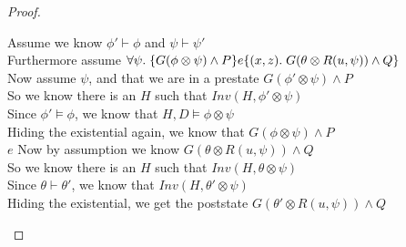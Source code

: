 \begin{proof}
\begin{tabbedproof}
\oo Assume we know $\phi' \vdash \phi$ and $\psi \vdash \psi'$ \\
\oo Furthermore assume $\forall \psi.\; \{{G(\phi \otimes \psi) \land P}\}{e}\{{(x,z)}.\;{G(\theta\otimes R(u, \psi)) \land Q}\}$ \\
\ooo Now assume $\psi$, and that we are in a prestate $G(\phi' \otimes \psi) \land P$ \\
\ooo So we know there is an $H$ such that $\mathit{Inv}(H, \phi' \otimes \psi)$ \\
\ooo Since $\phi' \models \phi$, we know that $H, D \models \phi \otimes \psi$ \\
\ooo Hiding the existential again, we know that $G(\phi \otimes \psi) \land P$ \\
\ooo $e$
\ooo Now by assumption we know $G(\theta \otimes R(u, \psi)) \land Q$ \\
\ooo So we know there is an $H$ such that $\mathit{Inv}(H, \theta \otimes \psi)$ \\
\ooo Since $\theta \vdash \theta'$, we know that $\mathit{Inv}(H, \theta' \otimes \psi)$ \\
\ooo Hiding the existential, we get the poststate $G(\theta'\otimes R(u, \psi)) \land Q$ \\
\end{tabbedproof}
\end{proof}

